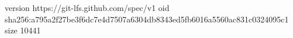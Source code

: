 version https://git-lfs.github.com/spec/v1
oid sha256:a795a2f27be3f6dc7e4d7507a6304db8343ed5fb6016a5560ac831c0324095c1
size 10441

